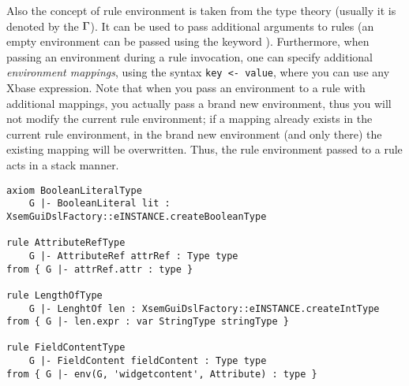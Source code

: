 Also the concept of rule environment is taken from the type theory (usually it
is denoted by the $\Gamma$).  It can be used to pass additional arguments to rules
(an empty environment can be passed using the keyword ).
Furthermore, when passing an environment during a rule invocation, one
can specify additional \emph{environment mappings}, using the syntax
\lstinline[breakatwhitespace=false,breaklines=true]!key <- value!, 
where you can use any Xbase expression.
Note that when you pass an environment to a rule with additional mappings,
you actually pass a brand new environment, thus you will not modify the
current rule environment; if a mapping already exists in the current rule
environment, in the brand new environment (and only there) the existing mapping
will be overwritten.  Thus, the rule environment passed to a rule acts
in a stack manner.



\begin{lstlisting}[language=xsemantics,float,label=lst:xsem-firstrules,caption=Some
examples of rules and axioms in Xsemantics.]
axiom BooleanLiteralType
	G |- BooleanLiteral lit : XsemGuiDslFactory::eINSTANCE.createBooleanType

rule AttributeRefType
	G |- AttributeRef attrRef : Type type
from { G |- attrRef.attr : type }

rule LengthOfType
	G |- LenghtOf len : XsemGuiDslFactory::eINSTANCE.createIntType
from { G |- len.expr : var StringType stringType }

rule FieldContentType
	G |- FieldContent fieldContent : Type type
from { G |- env(G, 'widgetcontent', Attribute) : type }
\end{lstlisting}

